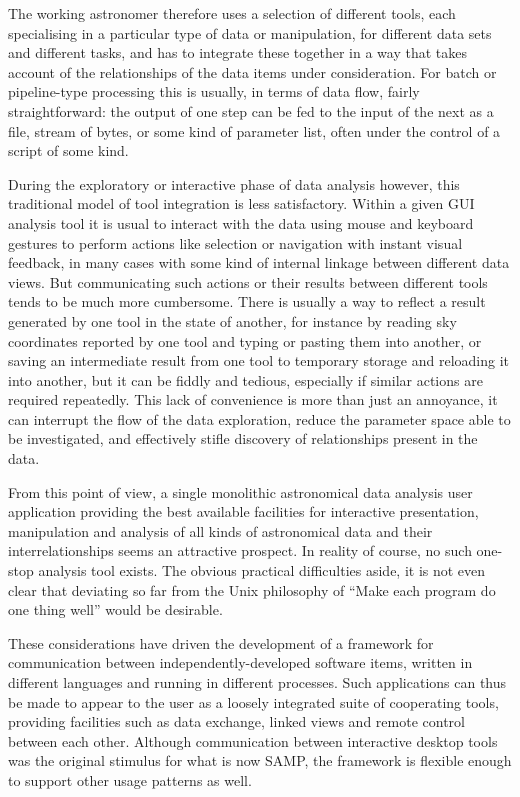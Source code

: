 \documentclass[5p]{elsarticle}
\begin{document}
The working astronomer therefore uses a selection of different tools,
each specialising in a particular type of data or manipulation,
for different data sets and different tasks,
and has to integrate these together in a way that takes account of
the relationships of the data items under consideration.
For batch or pipeline-type processing this is usually, in terms of
data flow, fairly straightforward: the output of one step can be
fed to the input of the next as a file, stream of bytes, or some
kind of parameter list, often under the control of a script of some kind.

During the exploratory or interactive phase of data analysis however,
this traditional model of tool integration is less satisfactory.
Within a given GUI analysis
tool it is usual to interact with the data using
mouse and keyboard gestures to perform actions like selection or
navigation with instant visual feedback, in many cases with some
kind of internal linkage between different data views.
But communicating such actions or their results between different
tools tends to be much more cumbersome.
There is usually a way to reflect a result generated by one tool
in the state of another, for instance by reading sky coordinates
reported by one tool and typing or pasting them into another,
or saving an intermediate result from one tool to temporary storage
and reloading it into another, but it can be fiddly and tedious,
especially if similar actions are required repeatedly.
This lack of convenience is more than just an annoyance, it can
interrupt the flow of the data exploration, reduce the parameter
space able to be investigated, and effectively stifle discovery
of relationships present in the data.


From this point of view, a single monolithic astronomical data analysis
user application providing the best available facilities for
interactive presentation, manipulation and analysis of all kinds of
astronomical data and their interrelationships seems an attractive prospect.
In reality of course, no such one-stop analysis tool exists.
The obvious practical difficulties aside, it is not even clear
that deviating so far from the Unix philosophy of
``Make each program do one thing well'' \citep{mcilroy1978}
would be desirable.

These considerations have driven the development of a framework
for communication between independently-developed software items,
written in different languages and running in different processes.
Such applications can thus be made to appear to the user
as a loosely integrated suite of cooperating tools,
providing facilities such as data exchange, linked views and
remote control between each other.
Although communication between interactive desktop tools was the
original stimulus for what is now SAMP, the framework is flexible
enough to support other usage patterns as well.
\end{document}
